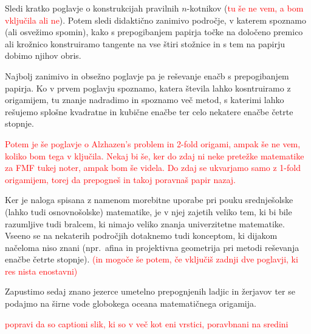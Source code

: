 Sledi kratko poglavje o konstrukcijah pravilnih $n$-kotnikov (\textcolor{red}{tu še ne vem, a bom vključila ali ne}). Potem sledi didaktično zanimivo področje, v katerem spoznamo (ali osvežimo spomin), kako s prepogibanjem papirja točke na določeno premico ali krožnico konstruiramo tangente na vse štiri stožnice in s tem na papirju dobimo njihov obris.

Najbolj zanimivo in obsežno poglavje pa je reševanje enačb s prepogibanjem papirja. Ko v prvem poglavju spoznamo, katera števila lahko kosntruiramo z origamijem, tu znanje nadradimo in spoznamo več metod, s katerimi lahko rešujemo splošne kvadratne in kubične enačbe ter celo nekatere enačbe četrte stopnje.

\textcolor{red}{Potem je še poglavje o Alzhazen's problem in 2-fold origami, ampak še ne vem, koliko bom tega v ključila. Nekaj bi še, ker do zdaj ni neke pretežke matematike za FMF tukej noter, ampak bom še videla. Do zdaj se ukvarjamo samo z 1-fold origamijem, torej da prepogneš in takoj poravnaš papir nazaj.}

Ker je naloga spisana z namenom morebitne uporabe pri pouku srednješolske (lahko tudi osnovnošolske) matematike, je v njej zajetih veliko tem, ki bi bile razumljive tudi bralcem, ki nimajo veliko znanja univerzitetne matematike. Vseeno se na nekaterih področjih dotaknemo tudi konceptom, ki dijakom načeloma niso znani (npr.\ afina in projektivna geometrija pri metodi reševanja enačbe četrte stopnje). \textcolor{red}{(in mogoče še potem, če vključiš zadnji dve poglavji, ki res nista enostavni)}

Zapustimo sedaj znano jezerce umetelno prepognjenih ladjic in žerjavov ter se podajmo na širne vode globokega oceana matematičnega origamija.

\textcolor{red}{popravi da so captioni slik, ki so v več kot eni vrstici, poravbnani na sredini}